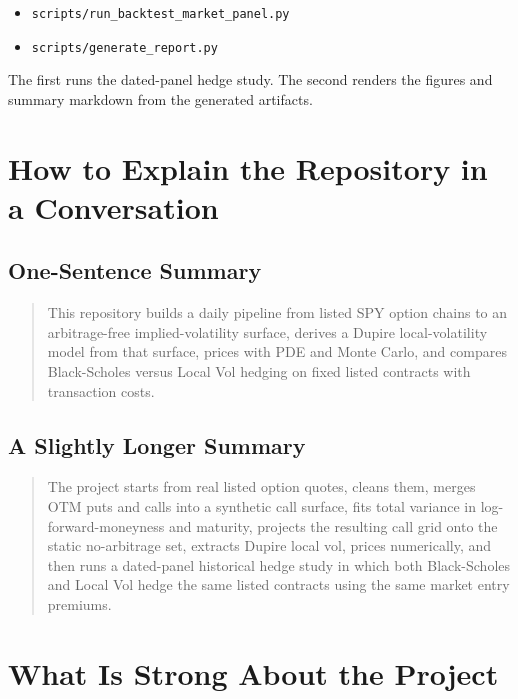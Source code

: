 \documentclass[11pt]{article}
\begin{document}
\begin{itemize}
  \item \texttt{scripts/run\_backtest\_market\_panel.py}
  \item \texttt{scripts/generate\_report.py}
\end{itemize}

The first runs the dated-panel hedge study. The second renders the figures and summary markdown from the generated artifacts.

\section{How to Explain the Repository in a Conversation}

\subsection{One-Sentence Summary}

\begin{quote}
This repository builds a daily pipeline from listed SPY option chains to an arbitrage-free implied-volatility surface, derives a Dupire local-volatility model from that surface, prices with PDE and Monte Carlo, and compares Black-Scholes versus Local Vol hedging on fixed listed contracts with transaction costs.
\end{quote}

\subsection{A Slightly Longer Summary}

\begin{quote}
The project starts from real listed option quotes, cleans them, merges OTM puts and calls into a synthetic call surface, fits total variance in log-forward-moneyness and maturity, projects the resulting call grid onto the static no-arbitrage set, extracts Dupire local vol, prices numerically, and then runs a dated-panel historical hedge study in which both Black-Scholes and Local Vol hedge the same listed contracts using the same market entry premiums.
\end{quote}

\section{What Is Strong About the Project}
\end{document}
